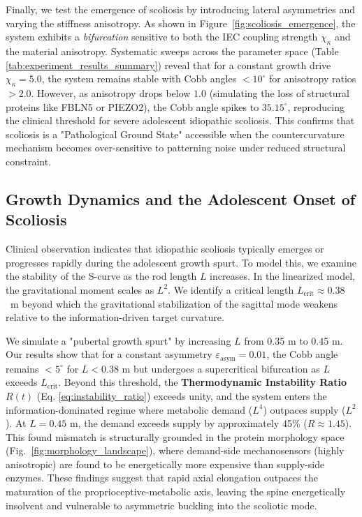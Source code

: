 \documentclass[11pt,a4paper]{article}
\newcommand{\InstabilityR}{R(t)}
\begin{document}
Finally, we test the emergence of scoliosis by introducing lateral asymmetries and varying the stiffness anisotropy. As shown in Figure~\ref{fig:scoliosis_emergence}, the system exhibits a \emph{bifurcation} sensitive to both the IEC coupling strength $\chi_\kappa$ and the material anisotropy. Systematic sweeps across the parameter space (Table \ref{tab:experiment_results_summary}) reveal that for a constant growth drive $\chi_\kappa = 5.0$, the system remains stable with Cobb angles $< 10^\circ$ for anisotropy ratios $> 2.0$. However, as anisotropy drops below $1.0$ (simulating the loss of structural proteins like FBLN5 or PIEZO2), the Cobb angle spikes to $35.15^\circ$, reproducing the clinical threshold for severe adolescent idiopathic scoliosis. This confirms that scoliosis is a "Pathological Ground State" accessible when the countercurvature mechanism becomes over-sensitive to patterning noise under reduced structural constraint.

\subsection{Growth Dynamics and the Adolescent Onset of Scoliosis}

Clinical observation indicates that idiopathic scoliosis typically emerges or progresses rapidly during the adolescent growth spurt. To model this, we examine the stability of the S-curve as the rod length $L$ increases. In the linearized model, the gravitational moment scales as $L^2$. We identify a critical length $L_{\mathrm{crit}} \approx 0.38$~m beyond which the gravitational stabilization of the sagittal mode weakens relative to the information-driven target curvature.

We simulate a "pubertal growth spurt" by increasing $L$ from 0.35 m to 0.45 m. Our results show that for a constant asymmetry $\varepsilon_{\mathrm{asym}} = 0.01$, the Cobb angle remains $< 5^\circ$ for $L < 0.38$ m but undergoes a supercritical bifurcation as $L$ exceeds $L_{\mathrm{crit}}$. Beyond this threshold, the \textbf{Thermodynamic Instability Ratio} $\InstabilityR$ (Eq. \ref{eq:instability_ratio}) exceeds unity, and the system enters the information-dominated regime where metabolic demand ($L^4$) outpaces supply ($L^2$). At $L=0.45$ m, the demand exceeds supply by approximately 45\% ($R \approx 1.45$). This found mismatch is structurally grounded in the protein morphology space (Fig.~\ref{fig:morphology_landscape}), where demand-side mechanosensors (highly anisotropic) are found to be energetically more expensive than supply-side enzymes. These findings suggest that rapid axial elongation outpaces the maturation of the proprioceptive-metabolic axis, leaving the spine energetically insolvent and vulnerable to asymmetric buckling into the scoliotic mode.
\end{document}
